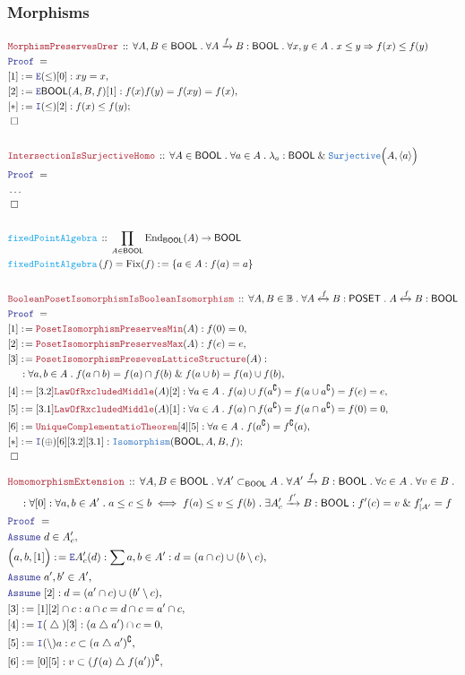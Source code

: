 \documentclass[12pt]{scrartcl}
\newcommand{\TYPE}[1]{\textcolor{NavyBlue}{\mathtt{#1}}}
\newcommand{\FUNC}[1]{\textcolor{Cerulean}{\mathtt{#1}}}
\newcommand{\LOGIC}[1]{\textcolor{Blue}{\mathtt{#1}}}
\newcommand{\THM}[1]{\textcolor{Maroon}{\mathtt{#1}}}
\renewcommand{\.}{\; . \;}
\newcommand{\de}{: \kern 0.1pc =}
\newcommand{\Act}[1]{\left( #1 \right)}
\newcommand{\Theorem}[2]{& \THM{#1} \, :: \, #2 \\ & \Proof = \\ }
\newcommand{\DeclareFunc}[2]{& \FUNC{#1} \, :: \, #2 \\}
\newcommand{\DefineNamedFunc}[4]{&  \FUNC{#1}\Act{#2} = #3 \de #4 \\}
\newcommand{\NewLine}{\\ & \kern 1pc}
\newcommand{\Page}[1]{ \begin{align*} #1 \end{align*}   }
\newcommand{\NoProof}{ & \ldots \\ \EndProof}
\renewcommand{\And}{\; \& \;}
\newcommand{\Imply}{\Rightarrow}
\newcommand{\Intro}{\LOGIC{I}}
\newcommand{\Elim}{\LOGIC{E}}
\newcommand{\End}{\mathrm{End}}
\newcommand{\ToIso}{\xleftrightarrow}
\newcommand{\Arrow}{\xrightarrow}
\newcommand{\du}{\; \triangle \;}
\renewcommand{\c}{\complement}
\newcommand{\Say}[3]{& #1 \de #2 : #3, \\}
\newcommand{\Conclude}[3]{& #1 \de #2 : #3; \\}
\newcommand{\Assume}[2]{& \LOGIC{Assume} \; #1 : #2, \\}
\newcommand{\AssumeIn}[2]{& \LOGIC{Assume} \; #1 \in #2, \\}
\newcommand{\QED}{\; \square}
\newcommand{\EndProof}{& \QED \\}
\newcommand{\Proof}{\LOGIC{Proof} \; }
\newcommand{\POSET}{\mathsf{POSET}}
\newcommand{\Bool}{\mathbb{B}}
\newcommand{\Fix}{\mathrm{Fix}}
\newcommand{\BOOL}{\mathsf{BOOL}}
\begin{document}
\subsubsection{Morphisms}
\Page{
	\Theorem{MorphismPreservesOrer}
	{
		\forall A,B \in \BOOL \.
		\forall A \Arrow{f} B : \BOOL \.
		\forall x,y \in A \.
		x \le y \Imply f(x) \le f(y)
	}
	\Say{[1]}{\Elim (\le)[0]}{xy = x}
	\Say{[2]}{\Elim \BOOL(A,B,f)[1]}{f(x)f(y) = f(xy) = f(x)}
	\Conclude{[*]}{\Intro (\le)[2]}{f(x) \le f(y)}
	\EndProof
	\\
	\Theorem{IntersectionIsSurjectiveHomo}
	{
		\forall A \in \BOOL \.
		\forall a \in A \.
		\lambda_a : \BOOL \And \TYPE{Surjective}\Big(A,\langle a \rangle \Big)
	}
	\NoProof
	\\
	\DeclareFunc{fixedPointAlgebra}{\prod_{A \in \BOOL} \End_{\BOOL}(A) \to \BOOL}
	\DefineNamedFunc{fixedPointAlgebra}{f}{\Fix(f)}{\{ a \in A : f(a) = a  \}}
	\\
	\Theorem{BooleanPosetIsomorphismIsBooleanIsomorphism}
	{
		\forall A,B \in \Bool \.
		\forall A \ToIso{f} B : \POSET \.
		A \ToIso{f} B : \BOOL
	}
	\Say{[1]}{\THM{PosetIsomorphismPreservesMin}(A)}{f(0) = 0}
	\Say{[2]}{\THM{PosetIsomorphismPreservesMax}(A)}{f(e) = e}
	\Say{[3]}{\THM{PosetIsomorphismPresevesLatticeStructure}(A)}
	{
		\NewLine :
		\forall a,b \in A \.
		f(a \cap b) = f(a) \cap f(b) 
		\And
		f(a \cup b) = f(a) \cup f(b)
	}
	\Say{[4]}{[3.2] \THM{LawOfRxcludedMiddle}(A)  [2]}
	{
		\forall a \in A \. 
		f(a) \cup f(a^\c) =
		f(a \cup a^\c) =
		f(e) = 
		e
	}
	\Say{[5]}{[3.1] \THM{LawOfRxcludedMiddle}(A)  [1]}
	{
		\forall a \in A \. 
		f(a) \cap f(a^\c) =
		f(a \cap a^\c) =
		f(0) = 
		0
	}
	\Say{[6]}{\THM{UniqueComplementatioTheorem}[4][5]}
	{
		\forall a \in A \.
		f(a^\c) = f^\c(a)
	}
	\Conclude{[*]}{\Intro(\oplus)[6][3.2][3.1]}
	{
		\TYPE{Isomorphism}(\BOOL,A,B,f)
	}
	\EndProof
}\Page{
	\Theorem{HomomorphismExtension}
	{
		\forall A,B \in \BOOL \.
		\forall A' \subset_{\BOOL} A \.
		\forall A' \Arrow{f} B : \BOOL \.
		\forall c \in A \.
		\forall v \in B \.
		\NewLine :
		\forall [0] : \forall a,b \in A' \. a \le c \le b \iff f(a) \le v \le f(b) \.
		\exists A'_c \Arrow{f'} B : \BOOL :
		f'(c) = v \And f'_{|A'}  = f
	}
	\AssumeIn{d}{A'_c}
	\Say{\Big(a,b,[1] \Big)}{\Elim A'_c(d)}
	{
		\sum a,b \in A' : d = (a\cap c) \cup (b\setminus c)
	}
	\AssumeIn{a',b'}{A'}
	\Assume{[2]}{d = (a' \cap c) \cup (b' \setminus c)}
	\Say{[3]}{ [1][2] \cap c }{ a \cap c = d \cap c =  a' \cap c }
	\Say{[4]}{\Intro (\du) [3]}{ (a \du a') \cap c = 0}
	\Say{[5]}{\Intro (\setminus) a}{c \subset (a \du a')^\c }
	\Say{[6]}{[0][5]}{v \subset (f(a) \du f(a'))^\c}
}
\end{document}
